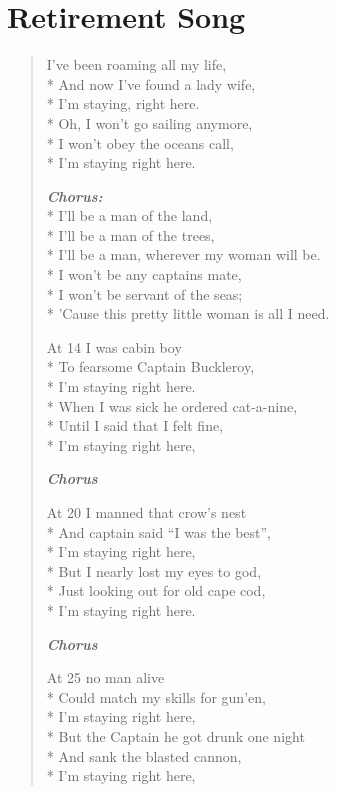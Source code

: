 \documentclass[9pt,twoside]{extarticle}
\newenvironment{xverse}{
	\begin{verse}
	\fontsize{8.5}{10.5}\selectfont
	}
	{
	\end{verse}
	\penalty 0
}
\newcommand{\chorusdef}{\textbf{\emph{Chorus:}}\\*}
\newcommand{\chorusmark}[1][1]{%
\vspace{-0.5\stanzaskip}%
\textbf{\emph{Chorus \ifthenelse{\equal{#1}{1}}{}{$\times$ #1}}}%
\vspace{-0.5\stanzaskip}%
}
\begin{document}
\section{Retirement Song}

\begin{xverse}
I’ve been roaming all my life, \\*
And now I’ve found a lady wife, \\*
I’m staying, right here. \\*
Oh, I won’t go sailing anymore, \\*
I won’t obey the oceans call, \\*
I’m staying right here.

\chorusdef
I’ll be a man of the land, \\*
I’ll be a man of the trees, \\*
I’ll be a man, wherever my woman will be. \\*
I won’t be any captains mate, \\*
I won’t be servant of the seas; \\*
’Cause this pretty little woman is all I need.

At 14 I was cabin boy \\*
To fearsome Captain Buckleroy, \\*
I’m staying right here. \\*
When I was sick he ordered cat-a-nine, \\*
Until I said that I felt fine, \\*
I’m staying right here,

\chorusmark

At 20 I manned that crow’s nest \\*
And captain said “I was the best”, \\*
I’m staying right here, \\*
But I nearly lost my eyes to god, \\*
Just looking out for old cape cod, \\*
I’m staying right here.

\chorusmark

At 25 no man alive \\*
Could match my skills for gun’en, \\*
I’m staying right here, \\*
But the Captain he got drunk one night \\*
And sank the blasted cannon, \\*
I’m staying right here,


\end{xverse}
\end{document}
